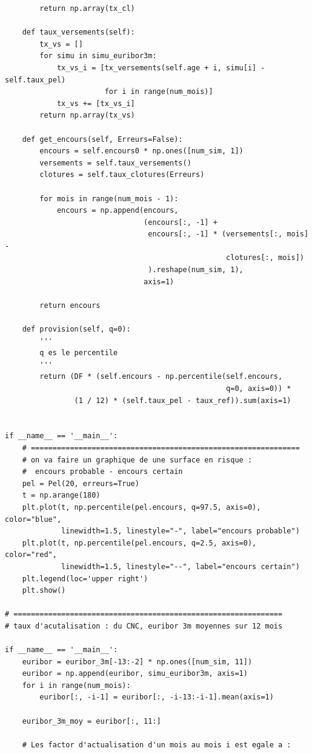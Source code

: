 \documentclass[12pt, a4paper]{book}
\begin{document}
{\begin{small}
\begin{verbatim}
        return np.array(tx_cl)

    def taux_versements(self):
        tx_vs = []
        for simu in simu_euribor3m:
            tx_vs_i = [tx_versements(self.age + i, simu[i] - self.taux_pel)
                       for i in range(num_mois)]
            tx_vs += [tx_vs_i]
        return np.array(tx_vs)

    def get_encours(self, Erreurs=False):
        encours = self.encours0 * np.ones([num_sim, 1])
        versements = self.taux_versements()
        clotures = self.taux_clotures(Erreurs)

        for mois in range(num_mois - 1):
            encours = np.append(encours,
                                (encours[:, -1] +
                                 encours[:, -1] * (versements[:, mois] -
                                                   clotures[:, mois])
                                 ).reshape(num_sim, 1),
                                axis=1)

        return encours

    def provision(self, q=0):
        '''
        q es le percentile
        '''
        return (DF * (self.encours - np.percentile(self.encours,
                                                   q=0, axis=0)) *
                (1 / 12) * (self.taux_pel - taux_ref)).sum(axis=1)


if __name__ == '__main__':
    # ==============================================================
    # on va faire un graphique de une surface en risque :
    #  encours probable - encours certain
    pel = Pel(20, erreurs=True)
    t = np.arange(180)
    plt.plot(t, np.percentile(pel.encours, q=97.5, axis=0), color="blue",
             linewidth=1.5, linestyle="-", label="encours probable")
    plt.plot(t, np.percentile(pel.encours, q=2.5, axis=0), color="red",
             linewidth=1.5, linestyle="--", label="encours certain")
    plt.legend(loc='upper right')
    plt.show()

# ==============================================================
# taux d'acutalisation : du CNC, euribor 3m moyennes sur 12 mois

if __name__ == '__main__':
    euribor = euribor_3m[-13:-2] * np.ones([num_sim, 11])
    euribor = np.append(euribor, simu_euribor3m, axis=1)
    for i in range(num_mois):
        euribor[:, -i-1] = euribor[:, -i-13:-i-1].mean(axis=1)

    euribor_3m_moy = euribor[:, 11:]

    # Les factor d'actualisation d'un mois au mois i est egale a :


\end{verbatim}
\end{small}}
\end{document}
